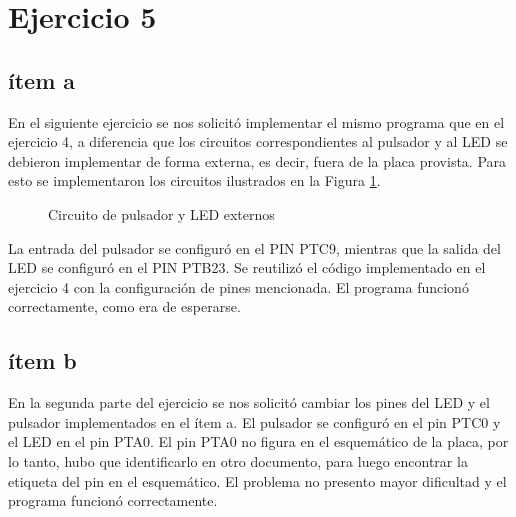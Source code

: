 \documentclass[micros_g1_main.tex]{subfiles}
\begin{document}
\section{Ejercicio 5}
\subsection{ítem a}
En el siguiente ejercicio se nos solicitó implementar el mismo programa que en el ejercicio 4, a diferencia que los circuitos correspondientes al pulsador y al LED se debieron implementar de forma externa, es decir, fuera de la placa provista. Para esto se implementaron los circuitos ilustrados en la Figura \ref{fig:circuitos_5}.

\begin{figure}[ht]
\centering

\label{fig:circuitos_5}
\caption{Circuito de pulsador y LED externos}
\end{figure}

La entrada del pulsador se configuró en el PIN PTC9, mientras que la salida del LED se configuró en el PIN PTB23. Se reutilizó el código implementado en el ejercicio 4 con la configuración de pines mencionada. El programa funcionó correctamente, como era de esperarse.

\subsection{ítem b}
En la segunda parte del ejercicio se nos solicitó cambiar los pines del LED y el pulsador implementados en el ítem a. El pulsador se configuró en el pin PTC0 y el LED en el pin PTA0. El pin PTA0 no figura en el esquemático de la placa, por lo tanto, hubo que identificarlo en otro documento, para luego encontrar la etiqueta del pin en el esquemático. El problema no presento mayor dificultad y el programa funcionó correctamente.
\end{document}
